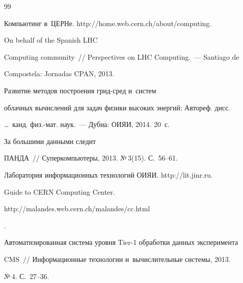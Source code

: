 {\small\frenchspacing


{%




\begin{thebibliography}{99}




Компьютинг в~ЦЕРНе. {\sf http://home.web.cern.ch/about/computing}.




 On behalf of the Spanish LHC


Computing community~/\!\!/ Perspectives on LHC Computing.~--- Santiago de


Compostela: Jornadas CPAN, 2013.




 Развитие методов построения грид-сред и~систем


облачных вычислений для задач физики высоких энергий: Автореф. дисс.\


\ldots\ канд. физ.-мат. наук.~--- Дубна: ОИЯИ, 2014. 20~с.




 За большими данными следит


ПАНДА~/\!\!/ Суперкомпьютеры, 2013. №\,3(15). С.~56--61.




Лаборатория информационных технологий ОИЯИ. {\sf http://lit.jinr.ru}.




Guide to CERN Computing Center. {\sf


http://malandes.web.cern.ch/malandes/cc.html}.






Автоматизированная система уровня Tier-1 обработки данных эксперимента


CMS~/\!\!/ Информационные технологии и~вычислительные системы, 2013.


№\,4. С.~27--36.





\end{thebibliography}}}
